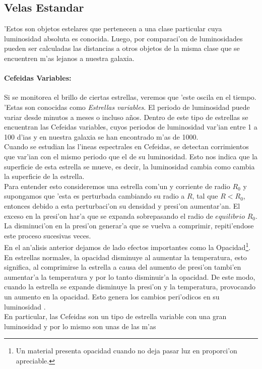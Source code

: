 \subsection{Velas Estandar}
'Estos son objetos estelares que pertenecen a una clase particular cuya luminosidad absoluta es conocida. Luego, por comparaci'on de luminosidades pueden ser
calculadas las distancias a otros objetos de la misma clase que se encuentren m'as lejanos a nuestra galaxia.
\paragraph{Cefeidas Variables:} Si se monitorea el brillo de ciertas estrellas, veremos que 'este oscila en el tiempo.
'Estas son conocidas como \textit{Estrellas variables}. El periodo de luminosidad puede variar desde minutos a meses o incluso
a\~nos. Dentro de este tipo de estrellas se encuentran las Cefeidas variables, cuyos periodos de luminosidad var'ian entre 1
a 100 d'ias y en nuestra galaxia se han encontrado  m'as de 1000.\\
Cuando se estudian las l'ineas espectrales en Cefeidas, se detectan corrimientos que var'ian con el mismo periodo que el de su 
luminosidad. Esto nos indica que la superficie de esta estrella se mueve, es decir, la luminosidad cambia como cambia la superficie
de la estrella.\\
Para entender esto consideremos una estrella com'un y corriente de radio $R_{0}$ y supongamos que 'esta es perturbada cambiando
su radio a $R$, tal que $R<R_{0}$, entonces debido a esta perturbaci'on su densidad y presi'on aumentar'an. El exceso en la presi'on
har'a que se expanda sobrepasando el radio de $equilibrio$ $R_{0}$. La disminuci'on en la presi'on generar'a que se vuelva
a comprimir, repiti'endose este proceso sucesivas veces.\\
En el an'alisis anterior dejamos de lado efectos importantes como la Opacidad\footnote{Un material presenta opacidad cuando no deja pasar luz en proporci'on apreciable.}.
En estrellas normales, la opacidad disminuye al aumentar la temperatura, esto significa, al comprimirse la estrella a causa del
aumento de presi'on tambi'en aumentar'a la temperatura y por lo tanto disminuir'a la opacidad. De este modo, cuando la estrella se expande
disminuye la presi'on y la temperatura, provocando un aumento en la opacidad. Esto genera los cambios peri'odicos en su luminosidad \cite{ceph2}.\\
En particular, las Cefeidas son un tipo de estrella variable con una gran luminosidad y por lo mismo son unas de las  m'as
